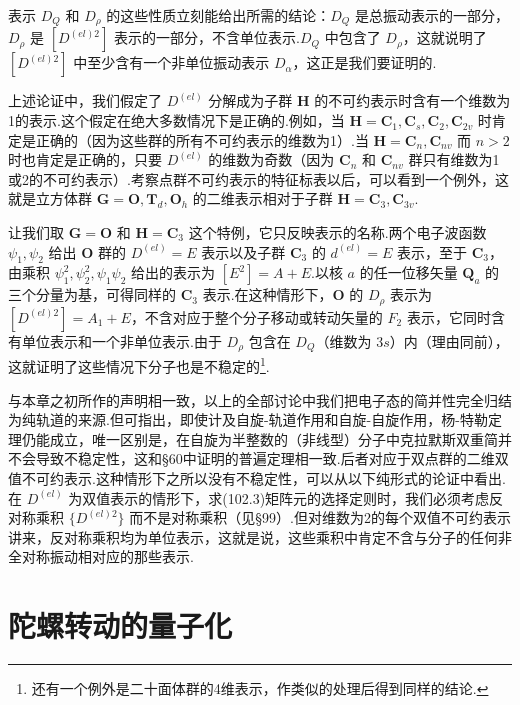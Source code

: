 表示 $D_Q$ 和 $D_\rho$ 的这些性质立刻能给出所需的结论：$D_Q$ 是总振动表示的一部分，$D_\rho$ 是 $[D^{(el)2}]$ 表示的一部分，不含单位表示.$D_Q$ 中包含了 $D_\rho$，这就说明了 $[D^{(el)2}]$ 中至少含有一个非单位振动表示 $D_\alpha$，这正是我们要证明的.

上述论证中，我们假定了 $D^{(el)}$ 分解成为子群 $\boldsymbol{H}$ 的不可约表示时含有一个维数为1的表示.这个假定在绝大多数情况下是正确的.例如，当 $\boldsymbol{H}=\boldsymbol{C}_1,\boldsymbol{C}_s,\boldsymbol{C}_2,\boldsymbol{C}_{2v}$ 时肯定是正确的（因为这些群的所有不可约表示的维数为1）.当 $\boldsymbol{H}=\boldsymbol{C}_n,\boldsymbol{C}_{nv}$ 而 $n>2$ 时也肯定是正确的，只要 $D^{(el)}$ 的维数为奇数（因为 $\boldsymbol{C}_n$ 和 $\boldsymbol{C}_{nv}$ 群只有维数为1或2的不可约表示）.考察点群不可约表示的特征标表以后，可以看到一个例外，这就是立方体群 $\boldsymbol{G}=\boldsymbol{O},\boldsymbol{T}_d,\boldsymbol{O}_h$ 的二维表示相对于子群 $\boldsymbol{H}=\boldsymbol{C}_3,\boldsymbol{C}_{3v}$.

让我们取 $\boldsymbol{G}=\boldsymbol{O}$ 和 $\boldsymbol{H}=\boldsymbol{C}_3$ 这个特例，它只反映表示的名称.两个电子波函数 $\psi_1,\psi_2$ 给出 $\boldsymbol{O}$ 群的 $D^{(el)}=E$ 表示以及子群 $\boldsymbol{C}_3$ 的 $d^{(el)}=E$ 表示，至于 $\boldsymbol{C}_3$，由乘积 $\psi_1^2,\psi_2^2,\psi_1\psi_2$ 给出的表示为 $[E^2]=A+E$.以核 $a$ 的任一位移矢量 $\boldsymbol{Q}_a$ 的三个分量为基，可得同样的 $\boldsymbol{C}_3$ 表示.在这种情形下，$\boldsymbol{O}$ 的 $D_\rho$ 表示为 $[D^{(el)2}]=A_1+E$，不含对应于整个分子移动或转动矢量的 $F_2$ 表示，它同时含有单位表示和一个非单位表示.由于 $D_\rho$ 包含在 $D_Q$（维数为 $3s$）内（理由同前），这就证明了这些情况下分子也是不稳定的\footnote{还有一个例外是二十面体群的4维表示，作类似的处理后得到同样的结论.}.

与本章之初所作的声明相一致，以上的全部讨论中我们把电子态的简并性完全归结为纯轨道的来源.但可指出，即使计及自旋-轨道作用和自旋-自旋作用，杨-特勒定理仍能成立，唯一区别是，在自旋为半整数的（非线型）分子中克拉默斯双重简并不会导致不稳定性，这和§60中证明的普遍定理相一致.后者对应于双点群的二维双值不可约表示.这种情形下之所以没有不稳定性，可以从以下纯形式的论证中看出.在 $D^{(el)}$ 为双值表示的情形下，求(102.3)矩阵元的选择定则时，我们必须考虑反对称乘积 $\{D^{(el)2}\}$ 而不是对称乘积（见§99）.但对维数为2的每个双值不可约表示讲来，反对称乘积均为单位表示，这就是说，这些乘积中肯定不含与分子的任何非全对称振动相对应的那些表示.

\section{陀螺转动的量子化}

